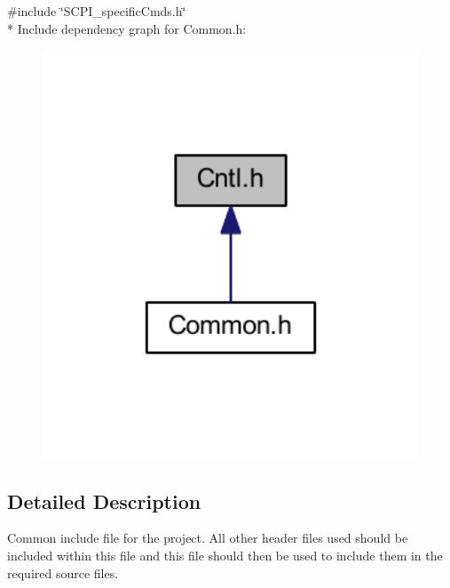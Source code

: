 {\ttfamily \#include \char`\"{}S\-C\-P\-I\-\_\-specific\-Cmds.\-h\char`\"{}}\\*
Include dependency graph for Common.\-h\-:
\nopagebreak
\begin{figure}[H]
\begin{center}
\leavevmode
\includegraphics[width=350pt]{a00042}
\end{center}
\end{figure}


\subsection{Detailed Description}
Common include file for the project. All other header files used should be included within this file and this file should then be used to include them in the required source files. 